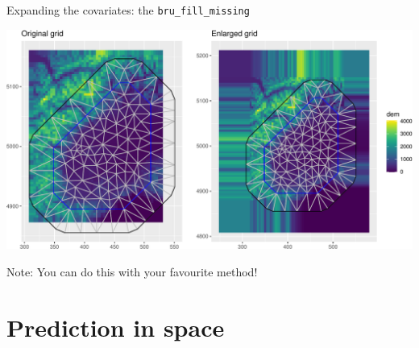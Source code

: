 \documentclass[
  ignorenonframetext,
]{beamer}
\begin{document}
\begin{frame}{Expanding the covariates: the \texttt{bru\_fill\_missing}}
\protect\hypertarget{expanding-the-covariates-the-bru_fill_missing-1}{}
\begin{center}\includegraphics[width=0.7\linewidth]{Part3_Spatial_files/figure-beamer/unnamed-chunk-34-1} \end{center}

Note: You can do this with your favourite method!
\end{frame}

\hypertarget{prediction-in-space}{%
\section{Prediction in space}\label{prediction-in-space}}
\end{document}
